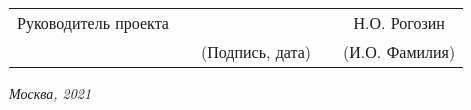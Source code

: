 \vspace{0.5cm}

\noindent
\begin{tabular}{l c c c c}
    Руководитель проекта & \hspace{3.3cm}   & \hspace{3.5cm}              & & Н.О. Рогозин \\\cline{3-3} \cline{5-5} 
    \hspace{2.9cm}  &              & {\footnotesize(Подпись, дата)} & & {\footnotesize(И.О. Фамилия)}
\end{tabular}

\begin{center}	
	\vfill
	\large \textit {Москва, 2021}
\end{center}

\thispagestyle {empty}
\pagebreak